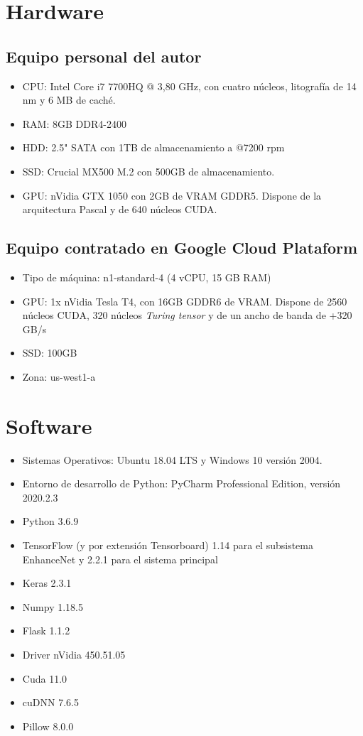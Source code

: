 \documentclass[../main.tex]{subfiles}
\begin{document}
\section{Hardware}
\subsection{Equipo personal del autor}
\begin{itemize}
    \item CPU: Intel Core i7 7700HQ @ 3,80 GHz, con cuatro núcleos, litografía de 14 nm y 6 MB de caché.
    \item RAM: 8GB DDR4-2400
    \item HDD: 2.5" SATA con 1TB de almacenamiento a @7200 rpm
    \item SSD: Crucial MX500 M.2 con 500GB de almacenamiento.
    \item GPU: nVidia GTX 1050 con 2GB de VRAM GDDR5. Dispone de la arquitectura Pascal y de 640 núcleos CUDA.
\end{itemize}
\subsection{Equipo contratado en Google Cloud Plataform}

\begin{itemize}
    \item Tipo de máquina: n1-standard-4 (4 vCPU, 15 GB RAM)
    \item GPU: 1x nVidia Tesla T4, con 16GB GDDR6 de VRAM. Dispone de 2560 núcleos CUDA, 320 núcleos \textit{Turing tensor} y de un ancho de banda de +320 GB/s
    \item SSD: 100GB
    \item Zona: us-west1-a 
\end{itemize}

\section{Software}

\begin{itemize}
    \item Sistemas Operativos: Ubuntu 18.04 LTS y Windows 10 versión 2004.
    \item Entorno de desarrollo de Python: PyCharm Professional Edition, versión 2020.2.3
    \item Python 3.6.9
    \item TensorFlow (y por extensión Tensorboard) 1.14 para el subsistema EnhanceNet y 2.2.1 para el sistema principal
    \item Keras 2.3.1
    \item Numpy 1.18.5
    \item Flask 1.1.2
    \item Driver nVidia 450.51.05
    \item Cuda 11.0
    \item cuDNN 7.6.5
    \item Pillow 8.0.0
\end{itemize}
\end{document}
